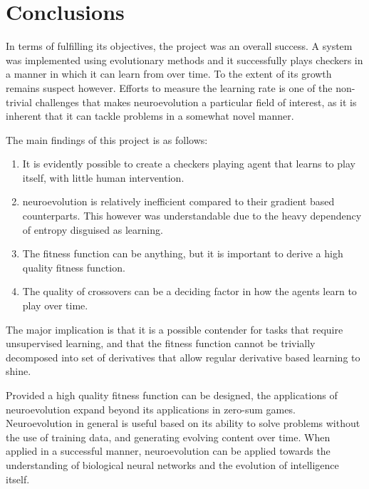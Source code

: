 \documentclass[12pt,a4paper]{article}
\begin{document}

\section{Conclusions}

    In terms of fulfilling its objectives, the project was an overall success. A system was implemented using evolutionary methods and it successfully plays checkers in a manner in which it can learn from over time. To the extent of its growth remains suspect however. Efforts to measure the learning rate is one of the non-trivial challenges that makes neuroevolution a particular field of interest, as it is inherent that it can tackle problems in a somewhat novel manner.
    
    The main findings of this project is as follows:
    \begin{enumerate}
    \item It is evidently possible to create a checkers playing agent that learns to play itself, with little human intervention.
    \item  neuroevolution is relatively inefficient compared to their gradient based counterparts. This however was understandable due to the heavy dependency of entropy disguised as learning.
    \item  The fitness function can be anything, but it is important to derive a high quality fitness function.
    \item The quality of crossovers can be a deciding factor in how the agents learn to play over time.
    \end{enumerate}

    The major implication is that it is a possible contender for tasks that require unsupervised learning, and that the fitness function cannot be trivially decomposed into set of derivatives that allow regular derivative based learning to shine.
    
    Provided a high quality fitness function can be designed, the applications of neuroevolution expand beyond its applications in zero-sum games. Neuroevolution in general is useful based on its ability to solve problems without the use of training data, and generating evolving content over time. When applied in a successful manner, neuroevolution can be applied towards the understanding of biological neural networks and the evolution of intelligence itself.


\end{document}
